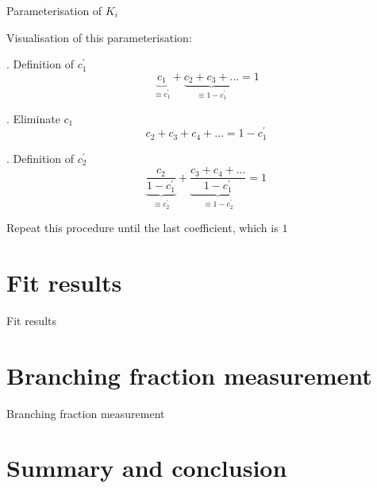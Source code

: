 \documentclass{beamer}
\begin{document}
\begin{frame}{Parameterisation of $K_i$}
  \vspace{0.0cm}
  \begin{center}
  {\large Visualisation of this parameterisation:}
  \end{center}
  \vspace{-0.3cm}
  \begin{center}
    \begin{block}{. Definition of $c_1^\prime$}
      \begin{equation*}
        \underbrace{c_1}_{\equiv c_1^\prime} + \underbrace{c_2 + c_3 + ...}_{\equiv 1 - c_1^\prime} = 1
      \end{equation*}
    \end{block}
    \begin{block}{. Eliminate $c_1$}
      \begin{equation*}
        c_2 + c_3 + c_4 + ... = 1 - c_1^\prime
      \end{equation*}
    \end{block}
    \begin{block}{. Definition of $c_2^\prime$}
      \begin{equation*}
        \underbrace{\frac{c_2}{1 - c_1^\prime}}_{\equiv c_2^\prime} + \underbrace{\frac{c_3 + c_4 + ...}{1 - c_1^\prime}}_{\equiv 1 - c_2^\prime} = 1
      \end{equation*}
    \end{block}
    Repeat this procedure until the last coefficient, which is $1$
  \end{center}
\end{frame}

\section{Fit results}
\begin{frame}{Fit results}
\end{frame}

\section{Branching fraction measurement}
\begin{frame}{Branching fraction measurement}
\end{frame}

\section{Summary and conclusion}
\end{document}
